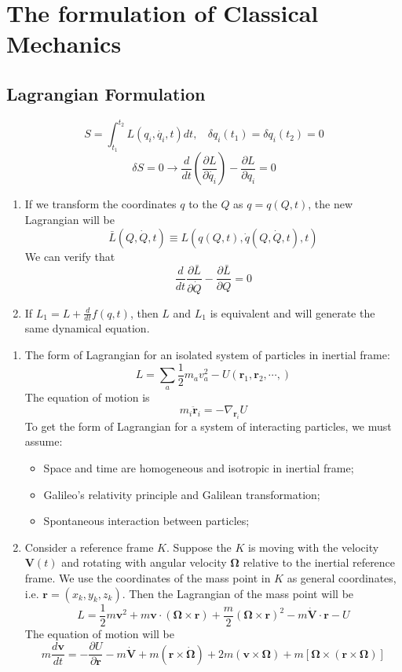 \chapter{The formulation of Classical Mechanics}
\section{Lagrangian Formulation}
\[S=\int_{t_1}^{t_2}L(q_i,\dot{q_i},t)dt, \ \ \ \ \delta q_i(t_1) = \delta q_i(t_2) = 0\]
\[\delta S=0 \rightarrow \frac{d}{dt}(\frac{\partial L}{\partial \dot{q_i}}) - \frac{\partial L}{\partial q_i}=0\]

\begin{enumerate}
\item If we transform the coordinates $q$ to the $Q$ as $q = q(Q,t)$, the new Lagrangian will be
\[\bar{L}(Q,\dot{Q},t) \equiv L(q(Q,t),\dot{q}(Q,\dot{Q},t),t)\]
We can verify that
\[\frac{d}{dt}\frac{\partial \bar{L}}{\partial \dot{Q}} - \frac{\partial \bar{L}}{\partial Q} = 0\]
\item If $L_1 = L + \frac{d}{dt} f(q,t)$, then $L$ and $L_1$ is equivalent and will generate the same dynamical equation.
\end{enumerate}

\begin{example}
\begin{enumerate}
\item The form of Lagrangian for an isolated system of particles in inertial frame:
\[L=\sum_a \frac{1}{2}m_a v_a^2 -U(\bm{r}_1,\bm{r}_2,\cdots,)\]
The equation of motion is
\[m_i \ddot{\bm{r}}_i = -\nabla_{\bm{r}_i} U\]
To get the form of Lagrangian for a system of interacting particles, we must assume:
\begin{itemize}
\item Space and time are homogeneous and isotropic in inertial frame;
\item Galileo's relativity principle and Galilean transformation;
\item Spontaneous interaction between particles;
\end{itemize}
\item Consider a reference frame $K$. Suppose the $K$ is moving with the velocity $\bm{V}(t)$ and  rotating with angular velocity $\bm{\Omega}$  relative to the inertial reference frame. We use the coordinates of the mass point in $K$ as general coordinates, i.e. $\bm{r} = (x_k,y_k,z_k)$. Then the Lagrangian of the mass point will be
\[L = \frac{1}{2}m\bm{v}^2 + m\bm{v}\cdot(\bm{\Omega}\times\bm{r})+\frac{m}{2}(\bm{\Omega}\times\bm{r})^2 - m\dot{\bm{V}}\cdot\bm{r}-U\]
The equation of motion will be
\[m\frac{d\bm{v}}{dt} = -\frac{\partial U}{\partial \bm{r}} - m\dot{\bm{V}} + m(\bm{r} \times \dot{\bm{\Omega}}) + 2m(\bm{v} \times \bm{\Omega}) + m[\bm{\Omega}\times(\bm{r} \times \bm{\Omega})]\]
\end{enumerate}
\end{example}

